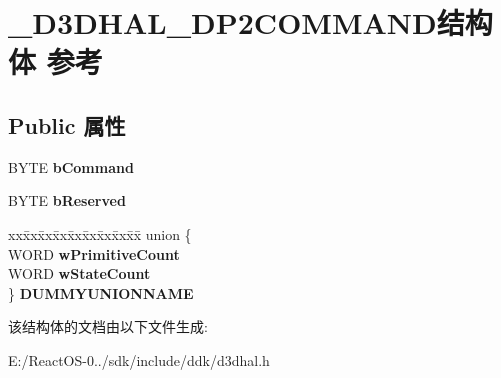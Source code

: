 \hypertarget{struct___d3_d_h_a_l___d_p2_c_o_m_m_a_n_d}{}\section{\+\_\+\+D3\+D\+H\+A\+L\+\_\+\+D\+P2\+C\+O\+M\+M\+A\+N\+D结构体 参考}
\label{struct___d3_d_h_a_l___d_p2_c_o_m_m_a_n_d}
\subsection*{Public 属性}
\begin{DoxyCompactItemize}
\item 
\mbox{\label{struct___d3_d_h_a_l___d_p2_c_o_m_m_a_n_d_aeaa77cf10984e959f3a2888418c8b12f}} 
B\+Y\+TE {\bfseries b\+Command}
\item 
\mbox{\label{struct___d3_d_h_a_l___d_p2_c_o_m_m_a_n_d_a4c9ab0dd066701a8c24f83d678e20c55}} 
B\+Y\+TE {\bfseries b\+Reserved}
\item 
\mbox{\label{struct___d3_d_h_a_l___d_p2_c_o_m_m_a_n_d_adcd2f24f464d8c8b549f6b2f4d9259bd}} 
\begin{tabbing}
xx\=xx\=xx\=xx\=xx\=xx\=xx\=xx\=xx\=\kill
union \{\\
\>WORD {\bfseries wPrimitiveCount}\\
\>WORD {\bfseries wStateCount}\\
\} {\bfseries DUMMYUNIONNAME}\\

\end{tabbing}\end{DoxyCompactItemize}


该结构体的文档由以下文件生成\+:\begin{DoxyCompactItemize}
\item 
E\+:/\+React\+O\+S-\/0../sdk/include/ddk/d3dhal.\+h\end{DoxyCompactItemize}
